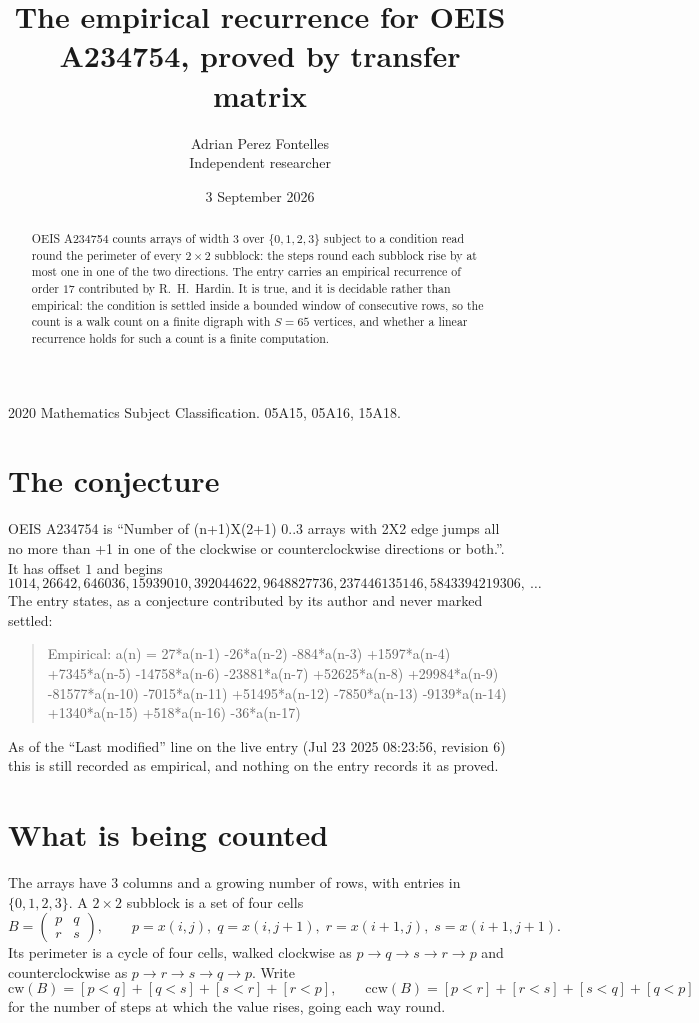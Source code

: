 \documentclass[11pt,a4paper]{article}
\title{The empirical recurrence for OEIS A234754, proved by transfer matrix}
\author{Adrian Perez Fontelles\\ \small Independent researcher}
\date{3 September 2026}
\theoremstyle{plain}
\theoremstyle{definition}
\begin{document}
\maketitle

\begin{abstract}
OEIS A234754 counts arrays of width $3$ over $\{0,1,2,3\}$ subject to a condition read round the
perimeter of every $2\times2$ subblock: the steps round each subblock rise by at most one in one of the two directions. The entry carries an empirical recurrence of
order $17$ contributed by R.~H.~Hardin. It is true, and it is decidable rather than
empirical: the condition is settled inside a bounded window of consecutive rows, so the
count is a walk count on a finite digraph with $S=65$ vertices, and whether a linear
recurrence holds for such a count is a finite computation.
\end{abstract}

\noindent\small 2020 Mathematics Subject Classification. 05A15, 05A16, 15A18.\normalsize

\section{The conjecture}

OEIS A234754 is ``Number of (n+1)X(2+1) 0..3 arrays with 2X2 edge jumps all no more than +1 in one of the clockwise or counterclockwise directions or both.''. It has offset $1$ and begins
\[
1014, 26642, 646036, 15939010, 392044622, 9648827736, 237446135146, 5843394219306,\ \dots
\]
The entry states, as a conjecture contributed by its author and never marked settled:
\begin{quote}
Empirical: a(n) = 27*a(n-1) -26*a(n-2) -884*a(n-3) +1597*a(n-4) +7345*a(n-5) -14758*a(n-6) -23881*a(n-7) +52625*a(n-8) +29984*a(n-9) -81577*a(n-10) -7015*a(n-11) +51495*a(n-12) -7850*a(n-13) -9139*a(n-14) +1340*a(n-15) +518*a(n-16) -36*a(n-17)
\end{quote}
As of the ``Last modified'' line on the live entry (Jul 23 2025 08:23:56, revision 6) this is still
recorded as empirical, and nothing on the entry records it as proved.

\section{What is being counted}

The arrays have $3$ columns and a growing number of rows, with entries in $\{0,1,2,3\}$. A
$2\times2$ subblock is a set of four cells
\[
B=\begin{pmatrix} p & q \\ r & s \end{pmatrix},
\qquad p=x(i,j),\; q=x(i,j+1),\; r=x(i+1,j),\; s=x(i+1,j+1).
\]
Its perimeter is a cycle of four cells, walked clockwise as $p\to q\to s\to r\to p$ and
counterclockwise as $p\to r\to s\to q\to p$. Write
\[
\mathrm{cw}(B)=[p<q]+[q<s]+[s<r]+[r<p],\qquad
\mathrm{ccw}(B)=[p<r]+[r<s]+[s<q]+[q<p]
\]
for the number of steps at which the value rises, going each way round.
\end{document}
